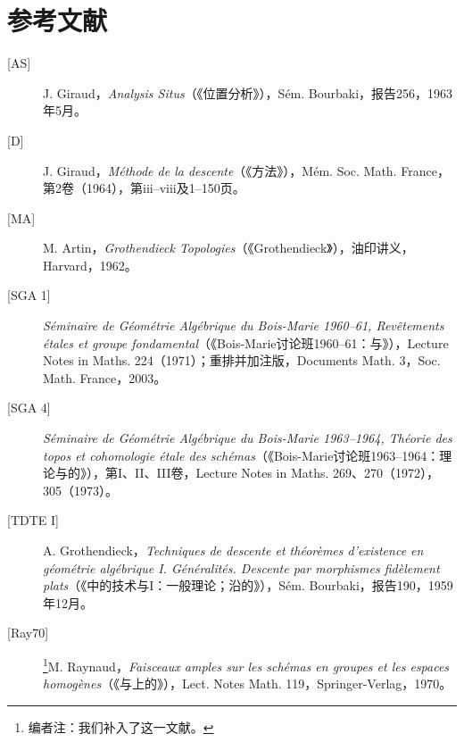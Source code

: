 \section*{参考文献}
\begin{description}
\item[{[AS]}] J. Giraud，\textit{Analysis Situs}（《位置分析》），Sém. Bourbaki，报告256，1963年5月。
\item[{[D]}] J. Giraud，\textit{Méthode de la descente}（《方法》），Mém. Soc. Math. France，第2卷（1964），第iii--viii及1--150页。
\item[{[MA]}] M. Artin，\textit{Grothendieck Topologies}（《Grothendieck》），油印讲义，Harvard，1962。
\item[{[SGA 1]}] \textit{Séminaire de Géométrie Algébrique du Bois-Marie 1960--61, Revêtements étales et groupe fondamental}（《Bois-Marie讨论班1960--61：与》），Lecture Notes in Maths. 224（1971）；重排并加注版，Documents Math. 3，Soc. Math. France，2003。
\item[{[SGA 4]}] \textit{Séminaire de Géométrie Algébrique du Bois-Marie 1963--1964, Théorie des topos et cohomologie étale des schémas}（《Bois-Marie讨论班1963--1964：理论与的》），第I、II、III卷，Lecture Notes in Maths. 269、270（1972），305（1973）。
\item[{[TDTE I]}] A. Grothendieck，\textit{Techniques de descente et théorèmes d'existence en géométrie algébrique I. Généralités. Descente par morphismes fidèlement plats}（《中的技术与I：一般理论；沿的》），Sém. Bourbaki，报告190，1959年12月。
\item[{[Ray70]}] \footnote{编者注：我们补入了这一文献。}M. Raynaud，\textit{Faisceaux amples sur les schémas en groupes et les espaces homogènes}（《与上的》），Lect. Notes Math. 119，Springer-Verlag，1970。
\end{description}
